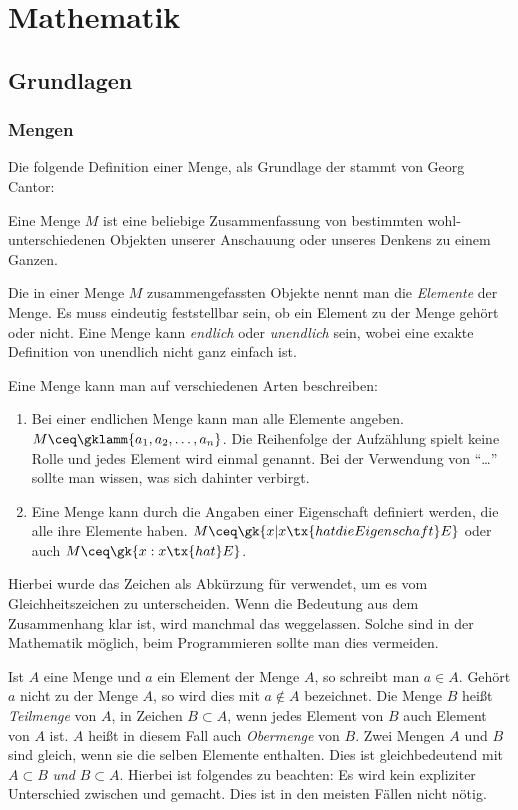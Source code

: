 \part{Mathematik}
\chapter{Grundlagen}
\section{Mengen}
Die folgende Definition einer Menge, als Grundlage der  stammt von Georg Cantor:
\begin{definition}
Eine Menge $M$ ist eine beliebige Zusammenfassung von bestimmten wohl-unterschiedenen Objekten unserer Anschauung oder unseres Denkens zu einem Ganzen.
\end{definition}

\begin{note}
Die in einer Menge $M$ zusammengefassten Objekte nennt man die \emph{Elemente} der Menge. Es muss eindeutig feststellbar sein, ob ein Element zu der Menge gehört oder nicht. Eine Menge kann \emph{endlich} oder \emph{unendlich} sein, wobei eine exakte Definition von unendlich nicht ganz einfach ist.
\end{note}

Eine Menge kann man auf verschiedenen Arten beschreiben:
\begin{enumerate}
\item Bei einer endlichen Menge kann man alle Elemente angeben. $M \ceq \gklamm{a_1, a_2, \dots, a_n}$. Die Reihenfolge der Aufzählung spielt keine Rolle und jedes Element wird einmal genannt. Bei der Verwendung von \enquote{\dots} sollte man wissen, was sich dahinter verbirgt.
\item Eine Menge kann durch die Angaben einer Eigenschaft definiert werden, die alle ihre Elemente haben. $M \ceq \gk{x \vert x \tx{ hat die Eigenschaft } E}$ oder auch $M \ceq \gk{x : x \tx{ hat } E}$.
\end{enumerate}

Hierbei wurde das Zeichen \enq{$\ceq$} als Abkürzung für  verwendet, um es vom Gleichheitszeichen \enq{$=$} zu unterscheiden. Wenn die Bedeutung aus dem Zusammenhang klar ist, wird manchmal das \enq{$:$} weggelassen. Solche  sind in der Mathematik möglich, beim Programmieren sollte man dies vermeiden.

Ist $A$ eine Menge und $a$ ein Element der Menge $A$, so schreibt man $a \in A$. Gehört $a$ nicht zu der Menge $A$, so wird dies mit $a \notin A$ bezeichnet. Die Menge $B$ heißt \emph{Teilmenge} von $A$, in Zeichen $B \subset A$, wenn jedes Element von $B$ auch Element von $A$ ist. $A$ heißt in diesem Fall auch \emph{Obermenge} von $B$. Zwei Mengen $A$ und $B$ sind gleich, wenn sie die selben Elemente enthalten. Dies ist gleichbedeutend mit $A \subset B$ \emph{und} $B \subset A$. Hierbei ist folgendes zu beachten: Es wird kein expliziter Unterschied zwischen \enq{$\subset$} und \enq{$\subseteq$} gemacht. Dies ist in den meisten Fällen nicht nötig.

